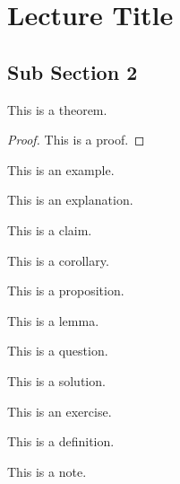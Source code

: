 
\section{Lecture Title}

\subsection{Sub Section 2}
\label{sub_sec:sub_section_2}

\begin{theorem}
This is a theorem.
\end{theorem}
\begin{proof}
This is a proof.
\end{proof}
\begin{example}
This is an example.
\end{example}
\begin{explanation}
This is an explanation.
\end{explanation}
\begin{claim}
This is a claim.
\end{claim}
\begin{corollary}
This is a corollary.
\end{corollary}
\begin{prop}
This is a proposition.
\end{prop}
\begin{lemma}
This is a lemma.
\end{lemma}
\begin{question}
This is a question.
\end{question}
\begin{solution}
This is a solution.
\end{solution}
\begin{exercise}
This is an exercise.
\end{exercise}
\begin{definition}[Definition]
This is a definition.
\end{definition}
\begin{note}
This is a note.
\end{note}


\newpage